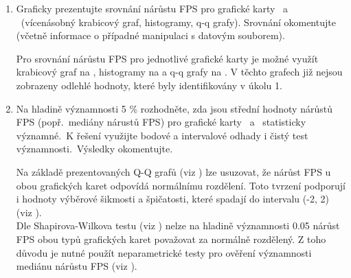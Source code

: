 \begin{enumerate}[label=\alph*)]
    \item Graficky prezentujte srovnání nárůstu FPS pro grafické karty \nvidiaCard\ a \amdCard\ (vícenásobný krabicový graf, histogramy, q-q grafy).
    Srovnání okomentujte (včetně informace o případné manipulaci s datovým souborem).

    \vspace{1em}
    \begin{minipage}{0.94\textwidth}
        Pro srovnání nárůstu FPS pro jednotlivé grafické karty je možné využít krabicový graf na , histogramy na  a q-q grafy na .
        V těchto grafech již nejsou zobrazeny odlehlé hodnoty, které byly identifikovány v úkolu 1.
    \end{minipage}

    \newpage
    \item Na hladině významnosti 5 \% rozhodněte, zda jsou střední hodnoty nárůstů FPS (popř.\ mediány nárustů FPS) pro grafické karty \nvidiaCard\ a
    \amdCard\ statisticky významné.\ K řešení využijte bodové a intervalové odhady i čistý test významnosti.\ Výsledky okomentujte.

    \vspace{1em}
    \begin{minipage}{0.94\textwidth}
        Na základě prezentovaných Q-Q grafů (viz ) lze usuzovat, že nárůst FPS u obou grafických karet odpovídá normálnímu rozdělení.
        Toto tvrzení podporují i hodnoty výběrové šikmosti a špičatosti, které spadají do intervalu (-2, 2) (viz ). \\

        Dle Shapirova-Wilkova testu (viz ) nelze na hladině významnosti 0.05 nárůst FPS obou typů grafických karet považovat za normálně rozdělený.
        Z toho důvodu je nutné použít neparametrické testy pro ověření významnosti mediánu nárůstu FPS (viz ).

        \label{tab:normality-test}
        \renewcommand{\arraystretch}{1.3}
        \vspace{1em}


\end{minipage}
\end{enumerate}
